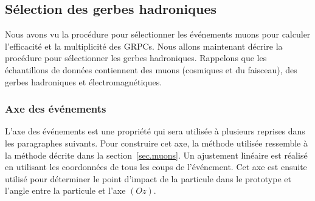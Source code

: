 \subsection{Sélection des gerbes hadroniques}
\label{sec.pi_selection}
Nous avons vu la procédure pour sélectionner les événements muons pour calculer l'efficacité et la multiplicité des GRPCs. Nous allons maintenant décrire la procédure pour sélectionner les gerbes hadroniques. Rappelons que les échantillons de données contiennent des muons (cosmiques et du faisceau), des gerbes hadroniques et électromagnétiques.
\subsubsection{Axe des événements}
L'axe des événements est une propriété qui sera utilisée à plusieurs reprises dans les paragraphes suivants. Pour construire cet axe, la méthode utilisée ressemble à la méthode décrite dans la section~\ref{sec.muons}. Un ajustement linéaire est réalisé en utilisant les coordonnées de tous les coups de l'événement. Cet axe est ensuite utilisé pour déterminer le point d'impact de la particule dans le prototype et l'angle entre la particule et l'axe $(Oz)$.
